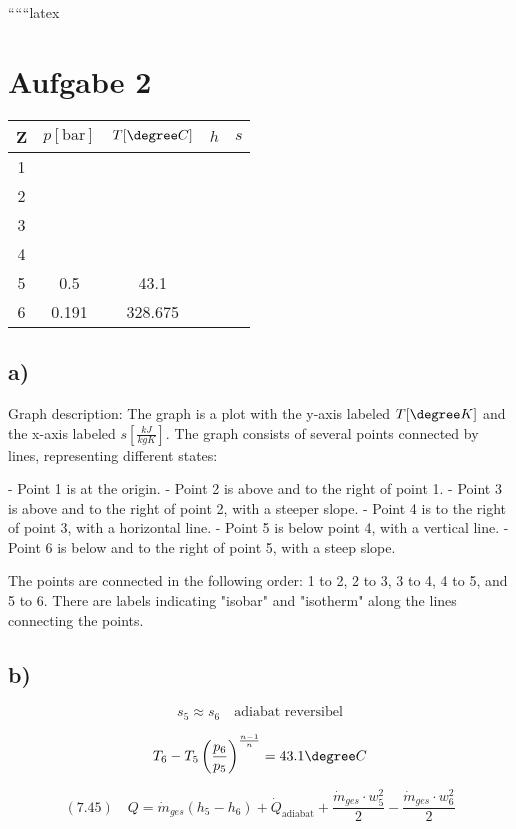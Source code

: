 
``````latex


\section*{Aufgabe 2}

\begin{tabular}{|c|c|c|c|c|}
\hline
Z & $p[\text{bar}]$ & $T[\degree C]$ & $h$ & $s$ \\
\hline
1 & & & & \\
\hline
2 & & & & \\
\hline
3 & & & & \\
\hline
4 & & & & \\
\hline
5 & 0.5 & 43.1 & & \\
\hline
6 & 0.191 & 328.675 & & \\
\hline
\end{tabular}

\subsection*{a)}

Graph description: The graph is a plot with the y-axis labeled $T[\degree K]$ and the x-axis labeled $s[\frac{kJ}{kgK}]$. The graph consists of several points connected by lines, representing different states:

- Point 1 is at the origin.
- Point 2 is above and to the right of point 1.
- Point 3 is above and to the right of point 2, with a steeper slope.
- Point 4 is to the right of point 3, with a horizontal line.
- Point 5 is below point 4, with a vertical line.
- Point 6 is below and to the right of point 5, with a steep slope.

The points are connected in the following order: 1 to 2, 2 to 3, 3 to 4, 4 to 5, and 5 to 6. There are labels indicating "isobar" and "isotherm" along the lines connecting the points.

\subsection*{b)}

\[
s_5 \approx s_6 \quad \text{adiabat reversibel}
\]

\[
T_6 - T_5 \left( \frac{p_6}{p_5} \right)^{\frac{n-1}{n}} = 43.1 \degree C
\]

\[
(7.45) \quad Q = \dot{m}_{ges} (h_5 - h_6) + \dot{Q}_{\text{adiabat}} + \frac{\dot{m}_{ges} \cdot w_5^2}{2} - \frac{\dot{m}_{ges} \cdot w_6^2}{2}
\]


